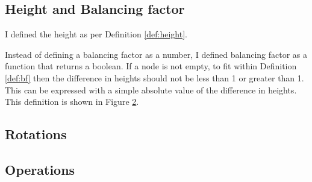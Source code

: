 \subsection*{Height and Balancing factor}
I defined the height as per Definition \ref{def:height}. 

\begin{figure}[!ht]
  \centering
  
  \caption{}
  \label{lst:height}
\end{figure}

Instead of defining a balancing factor as a number, I defined balancing factor as a function that returns a boolean. 
If a node is not empty, to fit within Definition \ref{def:bf} then the difference in heights should not be less than 1 or greater than 1.
This can be expressed with a simple absolute value of the difference in heights. This definition is shown in Figure \ref{lst:balanced}.

\begin{figure}[!ht]
  \centering
  
  \caption{}
  \label{lst:balanced}
\end{figure}

\subsection*{Rotations}

\subsection*{Operations}